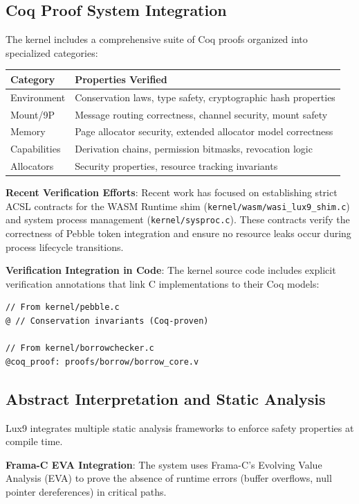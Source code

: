 \documentclass[11pt,letterpaper]{article}
\begin{document}
\subsection{Coq Proof System Integration}

The kernel includes a comprehensive suite of Coq proofs organized into specialized categories:

\begin{tabular}{|l|l|}
\hline
\textbf{Category} & \textbf{Properties Verified} \\
\hline
Environment & Conservation laws, type safety, cryptographic hash properties \\
Mount/9P & Message routing correctness, channel security, mount safety \\
Memory & Page allocator security, extended allocator model correctness \\
Capabilities & Derivation chains, permission bitmasks, revocation logic \\
Allocators & Security properties, resource tracking invariants \\
\hline
\end{tabular}

\textbf{Recent Verification Efforts}:
Recent work has focused on establishing strict ACSL contracts for the WASM Runtime shim (\texttt{kernel/wasm/wasi\_lux9\_shim.c}) and system process management (\texttt{kernel/sysproc.c}). These contracts verify the correctness of Pebble token integration and ensure no resource leaks occur during process lifecycle transitions.

\textbf{Verification Integration in Code}:
The kernel source code includes explicit verification annotations that link C implementations to their Coq models:

\begin{lstlisting}
// From kernel/pebble.c
@ // Conservation invariants (Coq-proven)

// From kernel/borrowchecker.c
@coq_proof: proofs/borrow/borrow_core.v
\end{lstlisting}

\subsection{Abstract Interpretation and Static Analysis}

Lux9 integrates multiple static analysis frameworks to enforce safety properties at compile time.

\textbf{Frama-C EVA Integration}:
The system uses Frama-C's Evolving Value Analysis (EVA) to prove the absence of runtime errors (buffer overflows, null pointer dereferences) in critical paths.
\end{document}
